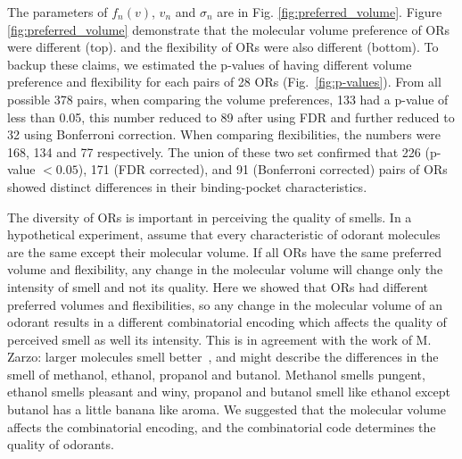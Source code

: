 \documentclass[11pt]{paper} %
\newcommand{\numberofreceptors}{ 28 }
\begin{document}
The parameters of $f_n(v)$, $v_n$ and $\sigma_n$ are in Fig. \ref{fig:preferred_volume}.
Figure \ref{fig:preferred_volume} demonstrate that the molecular volume preference of ORs were different (top). 
and the flexibility of ORs were also different (bottom).
To backup these claims, 
we estimated the p-values of having different volume preference and flexibility for each pairs of \numberofreceptors ORs
(Fig.~\ref{fig:p-values}). 
From all possible 378 pairs, 
when comparing the volume preferences, 
133 had a p-value of less than 0.05, 
this number reduced to 89 after using FDR and further reduced to 32 using Bonferroni correction.
When comparing flexibilities, 
the numbers were 168, 134 and 77 respectively. 
The union of these two set confirmed that 226 (p-value $<0.05$), 171 (FDR corrected), and 91 (Bonferroni corrected) pairs of ORs showed distinct differences in their binding-pocket characteristics.

The diversity of ORs is important in perceiving the quality of smells. 
In a hypothetical experiment, 
assume that every characteristic of odorant molecules are the same except their molecular volume.
If all ORs  have the same preferred volume and flexibility, 
any change in the molecular volume will change only the intensity of smell and not its quality.
Here we showed that ORs  had different preferred volumes and flexibilities, 
so any change in the molecular volume of an odorant results in a different combinatorial encoding which affects the quality of perceived smell as well its intensity.
This is in agreement with the work of M. Zarzo: larger molecules  smell better~\cite{zarzo2011},
and might describe the differences in the smell of methanol, ethanol, propanol and butanol. 
Methanol smells pungent, ethanol smells pleasant and winy, propanol and butanol smell like ethanol except butanol has a little banana like aroma.
We suggested that the molecular volume affects the combinatorial encoding, 
and the combinatorial code determines the quality of odorants.
\end{document}
